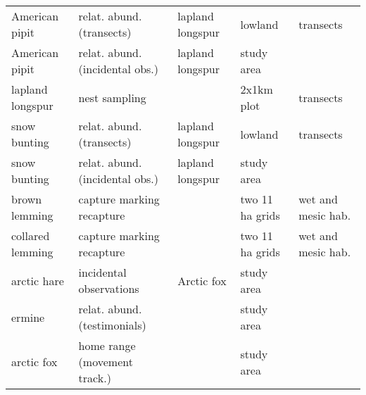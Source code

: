 \begin{table}[H]
\begin{tabularx}{\textwidth}{lllll}
  American pipit & relat. abund. (transects) & lapland longspur & lowland & transects \\ 
  American pipit & relat. abund. (incidental obs.) & lapland longspur & study area &  \\ 
  lapland longspur & nest sampling &  & 2x1km plot & transects \\ 
  snow bunting & relat. abund. (transects) & lapland longspur & lowland & transects \\ 
  snow bunting & relat. abund. (incidental obs.) & lapland longspur & study area &  \\ 
  brown lemming & capture marking recapture &  & two 11 ha grids & wet and mesic hab. \\ 
  collared lemming & capture marking recapture &  & two 11 ha grids & wet and mesic hab. \\ 
  arctic hare & incidental observations & Arctic fox & study area &  \\ 
  ermine & relat. abund. (testimonials) &  & study area &  \\ 
  arctic fox & home range (movement track.) &  & study area &  \\ 
   \hline
\end{tabularx}
\endgroup
\end{table}
